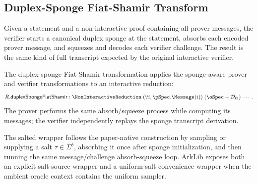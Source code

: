 \subsection{Duplex-Sponge Fiat-Shamir Transform}\label{sec:fiat_shamir_duplex_transform}

\begin{definition}
    \label{def:derive_transcript_dsfs}
    Given a statement and a non-interactive proof containing all prover messages, the verifier
    starts a canonical duplex sponge at the statement, absorbs each encoded prover message, and
    squeezes and decodes each verifier challenge. The result is the same kind of full transcript
    expected by the original interactive verifier.
\end{definition}

\begin{definition}
    \label{def:duplex_sponge_fiat_shamir}
    The duplex-sponge Fiat-Shamir transformation applies the sponge-aware prover and verifier
    transformations to an interactive reduction:
    \[
        R.\mathsf{duplexSpongeFiatShamir}
        : \NonInteractiveReduction
          \;(\forall i,\pSpec.\Message(i))\;
          (\oSpec + \mathcal{D}_{\mathfrak{S}})\;\cdots .
    \]
    The prover performs the same absorb/squeeze process while computing its messages; the verifier
    independently replays the sponge transcript derivation.
\end{definition}

\begin{definition}
    \label{def:salted_duplex_sponge_fiat_shamir}
    The salted wrapper follows the paper-native construction by sampling or supplying a salt
    $\tau \in \Sigma^\delta$, absorbing it once after sponge initialization, and then running the
    same message/challenge absorb-squeeze loop. ArkLib exposes both an explicit salt-source
    wrapper and a uniform-salt convenience wrapper when the ambient oracle context contains the
    uniform sampler.
\end{definition}

